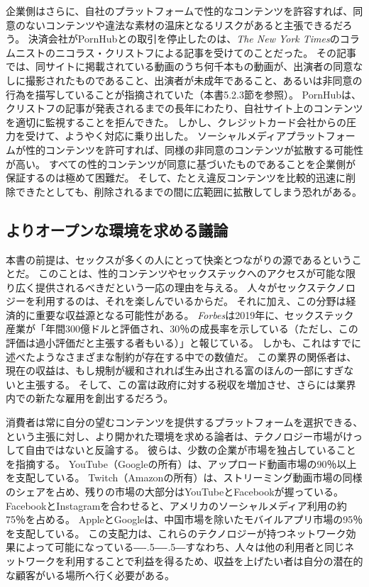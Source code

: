 \documentclass[paper=a4,book,openany]{jlreq}
\newcommand{\ig}[1]{}           %
\def\DDASH{―\kern-.5\zw―\kern-.5\zw―} %
\begin{document}
企業側はさらに、自社のプラットフォームで性的なコンテンツを許容すれば、同意のないコンテンツや違法な素材の温床となるリスクがあると主張できるだろう。
決済会社がPornHubとの取引を停止したのは、\emph{The New York Times}のコラムニストのニコラス・クリストフ\ig{Nicholas Kristof}による記事を受けてのことだった。
その記事では、同サイトに掲載されている動画のうち何千本もの動画が、出演者の同意なしに撮影されたものであること、出演者が未成年であること、あるいは非同意の行為を描写していることが指摘されていた（本書5.2.3節を参照）。
PornHubは、クリストフの記事が発表されるまでの長年にわたり、自社サイト上のコンテンツを適切に監視することを拒んできた。
しかし、クレジットカード会社からの圧力を受けて、ようやく対応に乗り出した。
ソーシャルメディアプラットフォームが性的コンテンツを許可すれば、同様の非同意のコンテンツが拡散する可能性が高い。
すべての性的コンテンツが同意に基づいたものであることを企業側が保証するのは極めて困難だ。
そして、たとえ違反コンテンツを比較的迅速に削除できたとしても、削除されるまでの間に広範囲に拡散してしまう恐れがある。

\subsection{よりオープンな環境を求める議論}

本書の前提は、セックスが多くの人にとって快楽とつながりの源であるということだ。
このことは、性的コンテンツやセックステックへのアクセスが可能な限り広く提供されるべきだという一応の理由を与える。
人々がセックステクノロジーを利用するのは、それを楽しんでいるからだ。
それに加え、この分野は経済的に重要な収益源となる可能性がある。
\emph{Forbes}は2019年に、セックステック産業が「年間300億ドルと評価され、30％の成長率を示している（ただし、この評価は過小評価だと主張する者もいる）」と報じている\citep{jaramillo19:_inves_sextec}。
しかも、これはすでに述べたようなさまざまな制約が存在する中での数値だ。
この業界の関係者は、現在の収益は、もし規制が緩和されれば生み出される富のほんの一部にすぎないと主張する。
そして、この富は政府に対する税収を増加させ、さらには業界内での新たな雇用を創出するだろう。

消費者は常に自分の望むコンテンツを提供するプラットフォームを選択できる、という主張に対し、より開かれた環境を求める論者は、テクノロジー市場がけっして自由ではないと反論する。
彼らは、少数の企業が市場を独占していることを指摘する。
YouTube（Googleの所有）は、アップロード動画市場の90％以上を支配している。
Twitch（Amazonの所有）は、ストリーミング動画市場の同様のシェアを占め、残りの市場の大部分はYouTubeとFacebookが握っている。
FacebookとInstagramを合わせると、アメリカのソーシャルメディア利用の約75％を占める\citep{department21:_us_market}。
AppleとGoogleは、中国市場を除いたモバイルアプリ市場の95％を支配している\citep{curry21:_app_store_data}。
この支配力は、これらのテクノロジーが持つネットワーク効果によって可能になっている{\DDASH}すなわち、人々は他の利用者と同じネットワークを利用することで利益を得るため、収益を上げたい者は自分の潜在的な顧客がいる場所へ行く必要がある。
\end{document}
